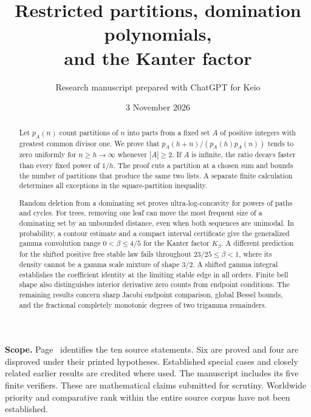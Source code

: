 \documentclass[11pt,a4paper]{article}
\title{Restricted partitions, domination polynomials,\protect\\and the Kanter factor}
\author{Research manuscript prepared with ChatGPT for Keio}
\date{3 November 2026}
\numberwithin{equation}{section}
\begin{document}
\maketitle
\begin{abstract}
Let $p_A(n)$ count partitions of $n$ into parts from a fixed set $A$ of
positive integers with greatest common divisor one. We prove that
$p_A(h+n)/(p_A(h)p_A(n))$ tends to zero uniformly for $n\ge h\to\infty$
whenever $|A|\ge2$. If $A$ is infinite, the ratio decays faster than
every fixed power of $1/h$. The proof cuts a partition at a
chosen sum and bounds the number of partitions that produce the same
two lists. A separate finite calculation determines all exceptions in
the square-partition inequality.

Random deletion from a dominating set proves ultra-log-concavity
for powers of paths and cycles. For trees, removing one leaf can move
the most frequent size of a dominating set by an unbounded distance,
even when both sequences are unimodal. In probability, a contour estimate
and a compact interval certificate give the generalized gamma convolution
range $0<\beta\le4/5$ for the Kanter factor $K_\beta$.
A different prediction for the shifted positive free stable law fails
throughout $23/25\le\beta<1$, where its density cannot be a gamma
scale mixture of shape $3/2$. A shifted gamma integral establishes
the coefficient identity at the limiting stable edge in all orders. Finite bell shape also distinguishes
interior derivative zero counts from endpoint conditions.
The remaining results concern sharp Jacobi endpoint comparison,
global Bessel bounds, and the fractional completely monotonic degrees
of two trigamma remainders.
\end{abstract}
\noindent\textbf{Scope.} Page~\pageref{sec:map} identifies the ten
source statements. Six are proved and four are disproved under their
printed hypotheses. Established special cases and closely related
earlier results are credited where used. The manuscript includes its
five finite verifiers. These are mathematical claims submitted for
scrutiny. Worldwide priority and comparative rank within the entire
source corpus have not been established.
\clearpage
\end{document}
